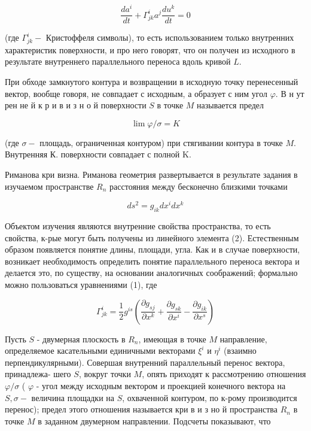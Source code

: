 \documentclass[10pt]{article}
\begin{document}
\[

\frac{d a^{i}}{d t}+\Gamma_{j k}^{i} a^{j} \frac{d u^{k}}{d t}=0

\]



(где $\Gamma_{j k}^{i}-$ Кристоффеля символы), то есть использованием только внутренних характеристик поверхности, и про него говорят, что он получен из исходного в результате внутреннего параллельного переноса вдоль кривой $L$.



При обходе замкнутого контура и возвращении в исходную точку перенесенный вектор, вообще говоря, не совпадает с исходным, а образует с ним угол $\varphi$. В н ут рен не й к р и в и з н о й поверхности $S$ в точке $M$ называется предел



\[

\lim \varphi / \sigma=K

\]



(где $\sigma-$ площадь, ограниченная контуром) при стягивании контура в точке $M$. Внутренняя К. поверхности совпадает с полной $\mathrm{K}$.



Риманова кри визна. Риманова геометрия развертывается в результате задания в изучаемом пространстве $R_{n}$ расстояния между бесконечно близкими точками



\[

d s^{2}=g_{i k} d x^{i} d x^{k}

\]



Объектом изучения являются внутренние свойства пространства, то есть свойства, к-рые могут быть получены из линейного элемента (2). Естественным образом появляется понятие длины, площади, угла. Как и в случае поверхности, возникает необходимость определить понятие параллельного переноса вектора и делается это, по существу, на основании аналогичных соображений; формально можно пользоваться уравнениями (1), где



\[

\Gamma_{j k}^{i}=\frac{1}{2} g^{i s}\left(\frac{\partial g_{s j}}{\partial x^{k}}+\frac{\partial g_{s k}}{\partial x^{i}}-\frac{\partial g_{i k}}{\partial x^{s}}\right)

\]



Пусть $S$ - двумерная плоскость в $R_{n}$, имеющая в точке $M$ направление, определяемое касательными единичными векторами $\xi^{i}$ и $\eta^{i}$ (взаимно перпендикулярными). Совершая внутренний параллельный перенос вектора, принадлежа- шего $S$, вокруг точки $M$, опять приходят к рассмотрению отношения $\varphi / \sigma$ ( $\varphi$ - угол между исходным вектором и проекцией конечного вектора на $S, \sigma-$ величина площадки на $S$, охваченной контуром, по к-рому производится перенос); предел этого отношения называется кри в и з но й пространства $R_{n}$ в точке $M$ в заданном двумерном направлении. Подсчеты показывают, что
\end{document}
